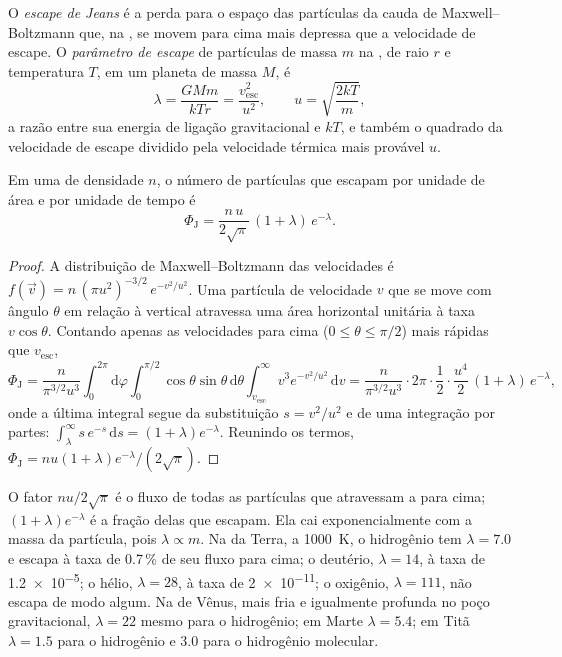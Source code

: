 \begin{definition}\label{def:b3:planetary-atmospheres:jeans-escape}
O \emph{escape de Jeans} é a perda para o espaço das
partículas da cauda de Maxwell--Boltzmann que, na , se movem para cima
mais depressa que a velocidade de escape. O \emph{parâmetro de
escape} de partículas de massa $m$ na ,
de raio $r$ e temperatura $T$, em um planeta de massa $M$, é
\[
\lambda = \frac{GMm}{kTr} = \frac{v_\mathrm{esc}^2}{u^2},
\qquad u = \sqrt{\frac{2kT}m},
\]
a razão entre sua energia de ligação gravitacional e $kT$, e também o
quadrado da velocidade de escape dividido pela velocidade térmica mais provável $u$.
\end{definition}

\begin{theorem}\label{thm:b3:planetary-atmospheres:jeans}
Em uma  de densidade $n$, o número de partículas que escapam por unidade
de área e por unidade de tempo é
\[
\Phi_\mathrm J = \frac{n\,u}{2\sqrt\pi}\,(1 + \lambda)\,e^{-\lambda}.
\]
\end{theorem}

\begin{proof}
A distribuição de Maxwell--Boltzmann das velocidades é $f(\vec v) =
n\,(\pi u^2)^{-3/2}\,e^{-v^2/u^2}$. Uma partícula de velocidade $v$ que se move
com ângulo $\theta$ em relação à vertical atravessa uma área horizontal unitária à
taxa $v\cos\theta$. Contando apenas as velocidades para cima ($0 \le \theta \le
\pi/2$) mais rápidas que $v_\mathrm{esc}$,
\[
\Phi_\mathrm J = \frac{n}{\pi^{3/2}u^3}\int_0^{2\pi}\!\!\mathrm d\varphi
\int_0^{\pi/2}\!\!\cos\theta\sin\theta\,\mathrm d\theta
\int_{v_\mathrm{esc}}^\infty v^3e^{-v^2/u^2}\,\mathrm dv
= \frac{n}{\pi^{3/2}u^3}\cdot2\pi\cdot\frac12\cdot
\frac{u^4}2\,(1 + \lambda)\,e^{-\lambda},
\]
onde a última integral segue da substituição $s = v^2/u^2$ e de
uma integração por partes: $\int_\lambda^\infty s\,e^{-s}\,\mathrm ds =
(1 + \lambda)e^{-\lambda}$. Reunindo os termos, $\Phi_\mathrm J = n u (1 +
\lambda) e^{-\lambda}/(2\sqrt\pi)$.
\end{proof}

O fator $n u/2\sqrt\pi$ é o fluxo de todas as partículas que atravessam a
 para cima; $(1 + \lambda)e^{-\lambda}$ é a fração delas
que escapam. Ela cai exponencialmente com a massa da partícula, pois
$\lambda \propto m$. Na  da Terra, a \qty{1000}{K}, o hidrogênio
tem $\lambda = 7.0$ e escapa à taxa de 0.7\,\% de seu fluxo para cima;
o deutério, $\lambda = 14$, à taxa de \num{1.2e-5}; o hélio, $\lambda = 28$,
à taxa de \num{2e-11}; o oxigênio, $\lambda = 111$, não escapa de modo algum. Na 
de Vênus, mais fria e igualmente profunda no poço gravitacional, $\lambda = 22$ mesmo para
o hidrogênio; em Marte $\lambda = 5.4$; em Titã $\lambda = 1.5$ para o hidrogênio
e 3.0 para o hidrogênio molecular.

